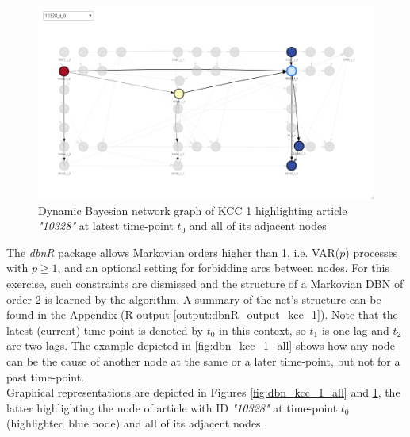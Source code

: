 \begin{figure}[H]
\centering
  \includegraphics[width=0.85\linewidth]{figures/dbn_kcc_1_article_10328_t_0.png}
  \caption{Dynamic Bayesian network graph of KCC 1 highlighting article \textit{"10328"} at latest time-point $t_0$ and all of its adjacent nodes}
  \label{fig:dbn_kcc_1_article_10328_t_0}
\end{figure}



The \textit{dbnR} package allows Markovian orders higher than 1, i.e. \ac{VAR}($p$) processes with $p \geq 1$, and an optional setting for forbidding arcs between nodes. For this exercise, such constraints are dismissed and the structure of a Markovian \ac{DBN} of order 2 is learned by the algorithm. A summary of the net's structure can be found in the Appendix (R output \ref{output:dbnR_output_kcc_1}). Note that the latest (current) time-point is denoted by $t_0$ in this context, so $t_1$ is one lag and $t_2$ are two lags. The example depicted in \autoref{fig:dbn_kcc_1_all} shows how any node can be the cause of another node at the same or a later time-point, but not for a past time-point. \\
 Graphical representations are depicted in Figures \ref{fig:dbn_kcc_1_all} and \ref{fig:dbn_kcc_1_article_10328_t_0}, the latter highlighting the node of article with ID \textit{"10328"} at time-point $t_0$ (highlighted blue node) and all of its adjacent nodes.